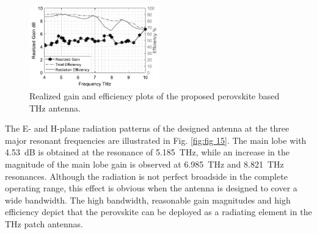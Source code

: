 \documentclass[12pt]{suhbook}
\begin{document}
\begin{figure}[hbt!]
\centering
\includegraphics[width=0.5\textwidth]{19}
\caption{Realized gain and efficiency plots of the proposed perovskite based THz antenna.}
\label{Fig 119}
\end{figure}
% 
The E- and H-plane radiation patterns of the designed antenna at the three major resonant frequencies are illustrated in Fig. \ref{fig:fig 15}. The main lobe with \SI{4.53}{\dB} is obtained at the resonance of \SI{5.185}{\THz}, while an increase in the magnitude of the main lobe gain is observed at \SI{6.985}{\THz} and \SI{8.821}{\THz} resonances. Although the radiation is not perfect broadside in the complete operating range, this effect is obvious when the antenna is designed to cover a wide bandwidth. The high bandwidth, reasonable gain magnitudes and high efficiency depict that the perovskite can be deployed as a radiating element in the THz patch antennas.
% 
\end{document}
